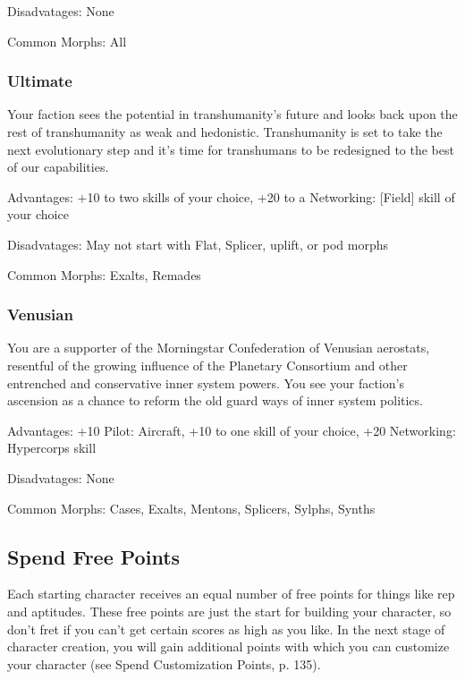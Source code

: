 Disadvatages: None

Common Morphs: All

\subsubsection{Ultimate}
\label{sec:ultimate}

Your faction sees the potential in transhumanity’s future and looks back upon the rest of transhumanity as weak and hedonistic. Transhumanity is set to take the next evolutionary step and it’s time for transhumans to be redesigned to the best of our capabilities.

Advantages: +10 to two skills of your choice, +20 to a Networking: [Field] skill of your choice

Disadvatages: May not start with Flat, Splicer, uplift, or pod morphs

Common Morphs: Exalts, Remades

\subsubsection{Venusian}
\label{sec:venusian}

You are a supporter of the Morningstar Confederation of Venusian aerostats, resentful of the growing influence of the Planetary Consortium and other entrenched and conservative inner system powers. You see your faction’s ascension as a chance to reform the old guard ways of inner system politics.

Advantages: +10 Pilot: Aircraft, +10 to one skill of your choice, +20 Networking: Hypercorps skill

Disadvatages: None

Common Morphs: Cases, Exalts, Mentons, Splicers, Sylphs, Synths

\subsection{Spend Free Points}
\label{sec:spend-free-points}

Each starting character receives an equal number of free points for things like rep and aptitudes. These free points are just the start for building your character, so don’t fret if you can’t get certain scores as high as you like. In the next stage of character creation, you will gain additional points with which you can customize your character (see Spend Customization Points, p. 135).


